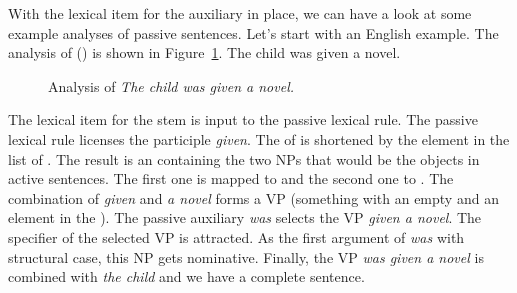 
With the lexical item for the auxiliary in place, we can have a look at some example analyses of
passive sentences. Let's start with an English example. The analysis of () is shown in
Figure~\ref{fig-the-child-was-given-a-novel}.
\ea
The child was given a novel.
\z
\begin{figure}
\caption{\label{fig-the-child-was-given-a-novel}Analysis of \emph{The child was given a novel.}}
\end{figure}

\noindent
The lexical item for the stem  is input to the passive lexical rule. The passive lexical
rule licenses the participle \emph{given}. The \argst of  is shortened by the element in
the \da list of  . The result is an \argstl containing the two NPs that would be the
objects in active sentences. The first one  is mapped to \spr and the second one 
to \comps. The combination of \emph{given} and \emph{a novel} forms a VP (something with an empty
\compsl and an element in the \sprl). The passive auxiliary \emph{was} selects the VP \emph{given a
  novel}. 
The specifier of the selected VP  is attracted. As the first argument of
\emph{was} with structural case, this NP gets nominative. Finally, the VP \emph{was given a novel}
is combined with \emph{the child} and we have a complete sentence.

